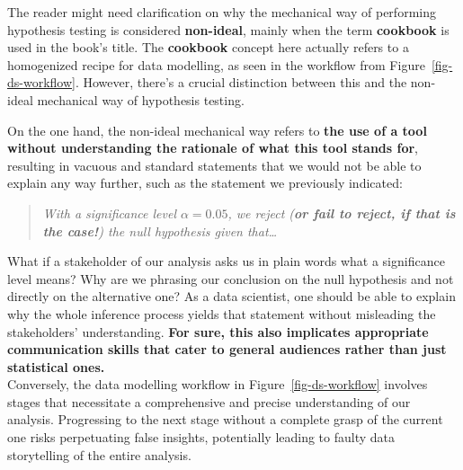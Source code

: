 \documentclass[
  letterpaper,
  DIV=11,
  numbers=noendperiod]{scrreprt}
\newcounter{quartocalloutnteno}
\newcommand{\quartocalloutnte}[1]{\refstepcounter{quartocalloutnteno}\label{#1}}
\begin{document}
\begin{tcolorbox}[enhanced jigsaw, bottomrule=.15mm, breakable, colback=white, leftrule=.75mm, coltitle=black, rightrule=.15mm, bottomtitle=1mm, title=\textcolor{quarto-callout-note-color}{\faInfo}\hspace{0.5em}{Note \ref*{nte-mechinical-clarification}: Heads-up on why we mean as a non-ideal mechanical analysis!}, opacitybacktitle=0.6, toprule=.15mm, titlerule=0mm, arc=.35mm, colbacktitle=quarto-callout-note-color!10!white, toptitle=1mm, colframe=quarto-callout-note-color-frame, left=2mm, opacityback=0]

\quartocalloutnte{nte-mechinical-clarification} 

The reader might need clarification on why the mechanical way of
performing hypothesis testing is considered \textbf{non-ideal}, mainly
when the term \textbf{cookbook} is used in the book's title. The
\textbf{cookbook} concept here actually refers to a homogenized recipe
for data modelling, as seen in the workflow from
Figure~\ref{fig-ds-workflow}. However, there's a crucial distinction
between this and the non-ideal mechanical way of hypothesis testing.

On the one hand, the non-ideal mechanical way refers to \textbf{the use
of a tool without understanding the rationale of what this tool stands
for}, resulting in vacuous and standard statements that we would not be
able to explain any way further, such as the statement we previously
indicated:\\

\begin{quote}
\emph{With a significance level \(\alpha = 0.05\), we reject (\textbf{or
fail to reject, if that is the case!}) the null hypothesis given
that\ldots{}}\\
\end{quote}

What if a stakeholder of our analysis asks us in plain words what a
significance level means? Why are we phrasing our conclusion on the null
hypothesis and not directly on the alternative one? As a data scientist,
one should be able to explain why the whole inference process yields
that statement without misleading the stakeholders' understanding.
\textbf{For sure, this also implicates appropriate communication skills
that cater to general audiences rather than just statistical ones.}\\

Conversely, the data modelling workflow in Figure~\ref{fig-ds-workflow}
involves stages that necessitate a comprehensive and precise
understanding of our analysis. Progressing to the next stage without a
complete grasp of the current one risks perpetuating false insights,
potentially leading to faulty data storytelling of the entire analysis.

\end{tcolorbox}
\end{document}
